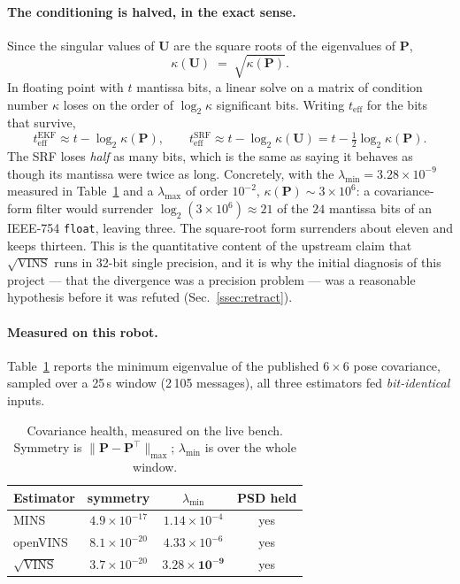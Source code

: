 \paragraph{The conditioning is halved, in the exact sense.}
Since the singular values of $\mathbf{U}$ are the square roots of the
eigenvalues of $\mathbf{P}$,
%
\begin{equation}
  \kappa(\mathbf{U}) \;=\; \sqrt{\kappa(\mathbf{P})} .
  \label{eq:kappa}
\end{equation}
%
In floating point with $t$ mantissa bits, a linear solve on a matrix of
condition number $\kappa$ loses on the order of $\log_{2}\kappa$ significant
bits. Writing $t_{\mathrm{eff}}$ for the bits that survive,
%
\begin{equation}
  t_{\mathrm{eff}}^{\mathrm{EKF}} \approx t - \log_{2}\kappa(\mathbf{P}),
  \qquad
  t_{\mathrm{eff}}^{\mathrm{SRF}} \approx t - \log_{2}\kappa(\mathbf{U})
                                      = t - \tfrac{1}{2}\log_{2}\kappa(\mathbf{P}).
  \label{eq:bits}
\end{equation}
%
The SRF loses \emph{half} as many bits, which is the same as saying it behaves
as though its mantissa were twice as long. Concretely, with the
$\lambda_{\min}=3.28\times10^{-9}$ measured in Table~\ref{tab:pdcheck} and a
$\lambda_{\max}$ of order $10^{-2}$, $\kappa(\mathbf{P})\sim3\times10^{6}$:
a covariance-form filter would surrender $\log_{2}(3\times10^{6})\approx21$ of
the $24$ mantissa bits of an IEEE-754 \texttt{float}, leaving three. The
square-root form surrenders about eleven and keeps thirteen. This is the
quantitative content of the upstream claim that $\sqrt{\text{VINS}}$ runs in
32-bit single precision, and it is why the initial diagnosis of this project
--- that the divergence was a precision problem --- was a reasonable
hypothesis before it was refuted (Sec.~\ref{ssec:retract}).

\paragraph{Measured on this robot.} Table~\ref{tab:pdcheck} reports the minimum
eigenvalue of the published $6\times6$ pose covariance, sampled over a 25\,s
window (2\,105 messages), all three estimators fed \emph{bit-identical} inputs.

\begin{table}[htbp]
\centering
\caption{Covariance health, measured on the live bench. Symmetry is
$\lVert \mathbf{P}-\mathbf{P}^{\top}\rVert_{\max}$; $\lambda_{\min}$ is over
the whole window.}
\label{tab:pdcheck}
\begin{tabular}{lccc}
\hline
Estimator & symmetry & $\lambda_{\min}$ & PSD held \\
\hline
MINS      & $4.9\times10^{-17}$ & $1.14\times10^{-4}$ & yes \\
openVINS  & $8.1\times10^{-20}$ & $4.33\times10^{-6}$ & yes \\
$\sqrt{\text{VINS}}$ & $3.7\times10^{-20}$ & $\mathbf{3.28\times10^{-9}}$ & yes \\
\hline
\end{tabular}
\end{table}

